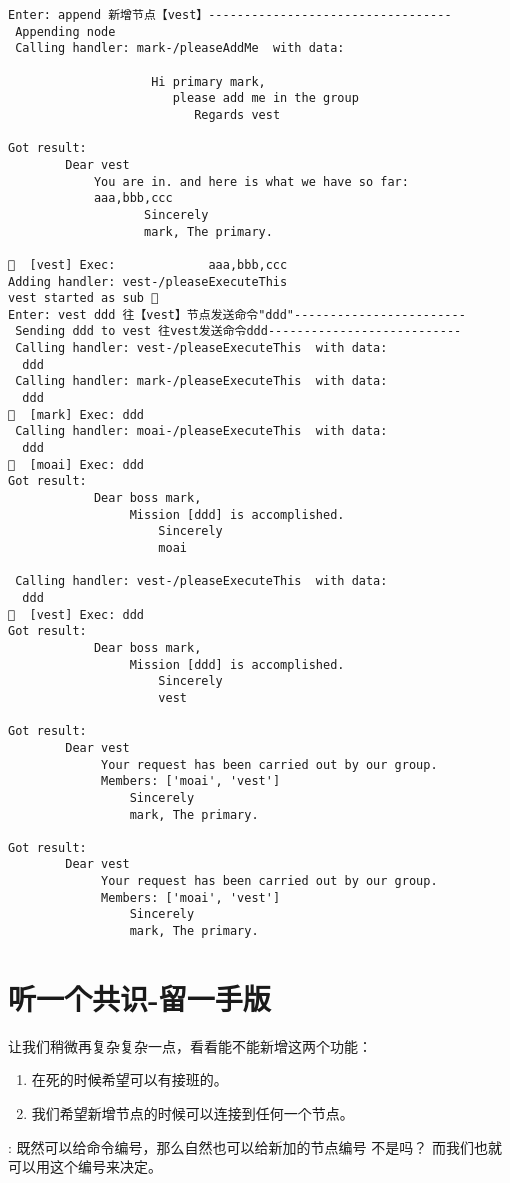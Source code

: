 \begin{verbatim}
Enter: append 新增节点【vest】----------------------------------
 Appending node 
 Calling handler: mark-/pleaseAddMe  with data:
  
                    Hi primary mark,
                       please add me in the group
                          Regards vest
                     
Got result: 
        Dear vest
            You are in. and here is what we have so far:
            aaa,bbb,ccc
                   Sincerely
                   mark, The primary.
         
🦜  [vest] Exec:             aaa,bbb,ccc 
Adding handler: vest-/pleaseExecuteThis
vest started as sub 🐸
Enter: vest ddd 往【vest】节点发送命令"ddd"------------------------
 Sending ddd to vest 往vest发送命令ddd---------------------------
 Calling handler: vest-/pleaseExecuteThis  with data:
  ddd 
 Calling handler: mark-/pleaseExecuteThis  with data:
  ddd 
🦜  [mark] Exec: ddd 
 Calling handler: moai-/pleaseExecuteThis  with data:
  ddd 
🦜  [moai] Exec: ddd 
Got result: 
            Dear boss mark,
                 Mission [ddd] is accomplished.
                     Sincerely
                     moai
             
 Calling handler: vest-/pleaseExecuteThis  with data:
  ddd 
🦜  [vest] Exec: ddd 
Got result: 
            Dear boss mark,
                 Mission [ddd] is accomplished.
                     Sincerely
                     vest
             
Got result: 
        Dear vest
             Your request has been carried out by our group.
             Members: ['moai', 'vest']
                 Sincerely
                 mark, The primary.
         
Got result: 
        Dear vest
             Your request has been carried out by our group.
             Members: ['moai', 'vest']
                 Sincerely
                 mark, The primary.

\end{verbatim}
\section{听一个共识-留一手版}

让我们稍微再复杂复杂一点，看看能不能新增这两个功能：
\begin{enumerate}
\item 在死的时候希望可以有接班的。
\item 我们希望新增节点的时候可以连接到任何一个节点。
\end{enumerate}
 : 既然可以给命令编号，那么自然也可以给新加的节点编号
不是吗？ 而我们也就可以用这个编号来决定。

